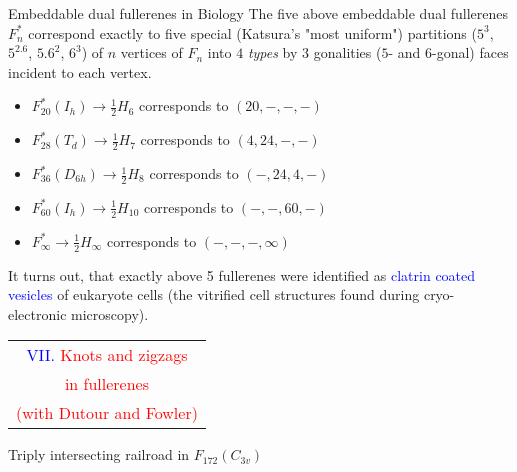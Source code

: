 \documentclass[%
pdf,
colorBG,
slideColor,
]{prosper}
\begin{document}
\begin{slide}{Embeddable dual fullerenes in Biology}
The five above embeddable dual fullerenes $F^{*}_n$ correspond exactly to 
five special 
(Katsura's "most uniform") partitions ($5^3$,
$5^2.6$, $5.6^2$,
$6^3$) of $n$ vertices of $F_{n}$ 
into $4$ 
{\em types} 
by $3$ gonalities ($5$- and $6$-gonal) faces incident to each vertex.
\begin{itemize}
\item $F^{*}_{20}(I_h)  \to \frac{1}{2}H_{6}$  corresponds to $(20,-,-,-)$

\item $F^{*}_{28}(T_d)  \to \frac{1}{2}H_{7}$  corresponds to $(4,24,-,-)$

\item $F^{*}_{36}(D_{6h})  \to \frac{1}{2}H_{8}$  corresponds to $(-,24,4,-)$

\item $F^{*}_{60}(I_h)  \to \frac{1}{2}H_{10}$  corresponds to $(-,-,60,-)$

\item $F^{*}_{\infty}  \to \frac{1}{2}H_{\infty}$  corresponds to $(-,-,-, 
\infty)$
\end{itemize}
It turns out, that exactly above 5 fullerenes were identified
as \textcolor{blue}{clatrin coated vesicles} of eukaryote cells (the 
vitrified cell structures found during cryo-electronic microscopy).


\end{slide}



\begin{slide}{}
\begin{center}
{\Huge 
\begin{tabular*}{8.5cm}{c}
\\[-0.4cm]
\textcolor{blue}{VII. }\textcolor{red}{Knots and zigzags}\\
\textcolor{red}{in fullerenes}\\
\textcolor{red}{(with Dutour and Fowler)}
\end{tabular*}
}
\end{center}
\end{slide}


\begin{slide}{Triply intersecting railroad in $F_{172}(C_{3v})$}
\begin{center}
\end{center}

\end{slide}
\end{document}
